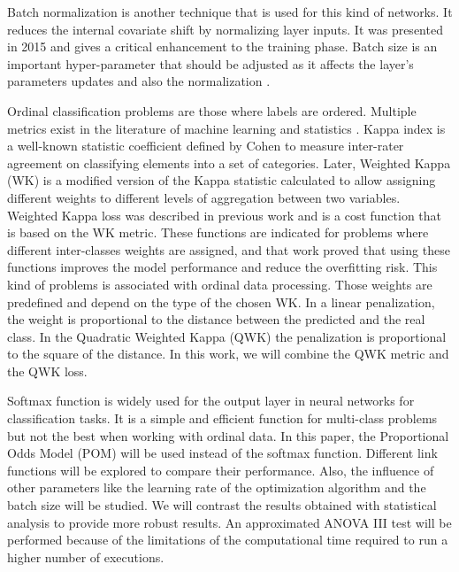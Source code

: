 \documentclass[10pt, a4paper, titlepage, twocolumn]{article}
\begin{document}
	Batch normalization is another technique that is used for this kind of networks. It reduces the internal covariate shift by normalizing layer inputs. It was presented in 2015 \cite{ioffe2015batch} and gives a critical enhancement to the training phase. Batch size is an important hyper-parameter that should be adjusted as it affects the layer's parameters updates and also the normalization \cite{keskar2016large}\cite{radiuk2017impact}.
	
	Ordinal classification problems are those where labels are ordered. Multiple metrics exist in the literature of machine learning and statistics \cite{cruz2014metrics}\cite{mehdiyev2016evaluating}. Kappa index is a well-known statistic coefficient defined by Cohen \cite{cohen1960coefficient} to measure inter-rater agreement on classifying elements into a set of categories. Later, Weighted Kappa (WK) is a modified version of the Kappa statistic calculated to allow assigning different weights to different levels of aggregation between two variables. Weighted Kappa loss was described in previous work \cite{de2018weighted} and is a cost function that is based on the WK metric. These functions are indicated for problems where different inter-classes weights are assigned, and that work proved that using these functions improves the model performance and reduce the overfitting risk. This kind of problems is associated with ordinal data processing. Those weights are predefined and depend on the type of the chosen WK. In a linear penalization, the weight is proportional to the distance between the predicted and the real class. In the Quadratic Weighted Kappa (QWK) the penalization is proportional to the square of the distance. In this work, we will combine the QWK metric and the QWK loss.
	
	Softmax function is widely used for the output layer in neural networks for classification tasks. It is a simple and efficient function for multi-class problems but not the best when working with ordinal data. In this paper, the Proportional Odds Model (POM) \cite{agresti2010analysis} will be used instead of the softmax function. Different link functions will be explored to compare their performance. Also, the influence of other parameters like the learning rate of the optimization algorithm and the batch size will be studied. We will contrast the results obtained with statistical analysis to provide more robust results. An approximated ANOVA III test will be performed because of the limitations of the computational time required to run a higher number of executions.
	
\end{document}
